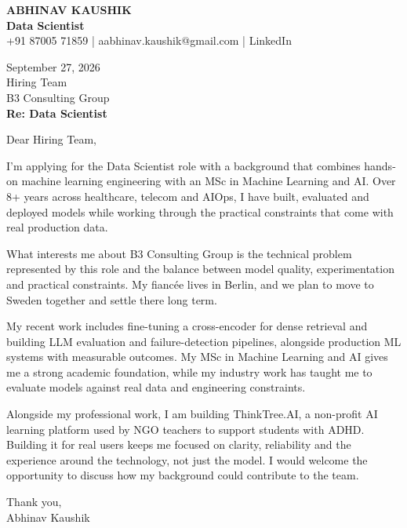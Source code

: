 \documentclass[10pt,a4paper]{article}
\begin{document}
\begin{center}
{\Large\bfseries ABHINAV KAUSHIK}\\[2pt]
{\bfseries Data Scientist}\\[2pt]
+91 87005 71859 \quad | \quad aabhinav.kaushik@gmail.com \quad | \quad LinkedIn
\end{center}
\vspace{8pt}
September 27, 2026\\[6pt]
Hiring Team\\
B3 Consulting Group\\[4pt]
\textbf{Re: Data Scientist}

Dear Hiring Team,

I’m applying for the Data Scientist role with a background that combines hands-on machine learning engineering with an MSc in Machine Learning and AI. Over 8+ years across healthcare, telecom and AIOps, I have built, evaluated and deployed models while working through the practical constraints that come with real production data.

What interests me about B3 Consulting Group is the technical problem represented by this role and the balance between model quality, experimentation and practical constraints. My fiancée lives in Berlin, and we plan to move to Sweden together and settle there long term.

My recent work includes fine-tuning a cross-encoder for dense retrieval and building LLM evaluation and failure-detection pipelines, alongside production ML systems with measurable outcomes. My MSc in Machine Learning and AI gives me a strong academic foundation, while my industry work has taught me to evaluate models against real data and engineering constraints.

Alongside my professional work, I am building ThinkTree.AI, a non-profit AI learning platform used by NGO teachers to support students with ADHD. Building it for real users keeps me focused on clarity, reliability and the experience around the technology, not just the model. I would welcome the opportunity to discuss how my background could contribute to the team.

Thank you,\\
Abhinav Kaushik
\end{document}
